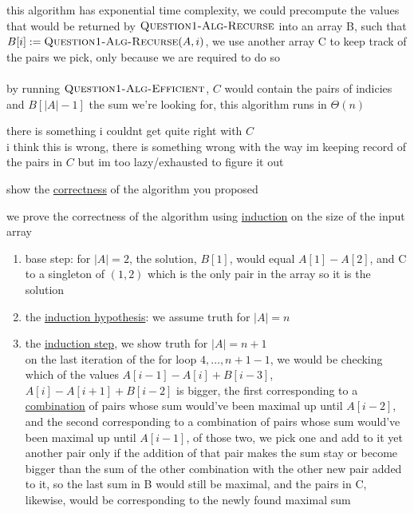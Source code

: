 \documentclass[a4paper,12pt]{article}
\begin{document}
\begin{question}
\begin{subquestion}
\begin{answer}
this algorithm has exponential time complexity, we could precompute the values that would be returned by \(\textsc{Question1-Alg-Recurse}\) into an array B, such that \(B[i] := \textsc{Question1-Alg-Recurse}(A, i)\), we use another array C to keep track of the pairs we pick, only because we are required to do so\\
\\

by running \(\textsc{Question1-Alg-Efficient}\), \(C\) would contain the pairs of indicies and \(B[|A|-1]\) the sum we're looking for, this algorithm runs in \(\Theta(n)\)\\
\begin{note}
there is something i couldnt get quite right with \(C\)\\
i think this is wrong, there is something wrong with the way im keeping record of the pairs in \(C\) but im too lazy/exhausted to figure it out\\
\end{note}
\end{answer}
\end{subquestion}
\begin{subquestion}
show the \href{20221104220603-algorithm_correctness.org}{correctness} of the algorithm you proposed\\
\begin{answer}
we prove the correctness of the algorithm using \href{20220707193301-mathematical_induction.org}{induction} on the size of the input array\\
\begin{enumerate}
\item base step: for \(|A|=2\), the solution, \(B[1]\), would equal \(A[1]-A[2]\), and C to a singleton of \((1,2)\) which is the only pair in the array so it is the solution\\
\item the \href{20230108230724-induction_hypothesis.org}{induction hypothesis}: we assume truth for \(|A|=n\)\\
\item the \href{20230108230748-induction_step.org}{induction step}, we show truth for \(|A|=n+1\)\\
on the last iteration of the for loop \(4,\dots,n+1-1\), we would be checking which of the values \(A[i-1]-A[i]+B[i-3]\),\(A[i]-A[i+1]+B[i-2]\) is bigger, the first corresponding to a \href{20221204105120-combinatorics.org}{combination} of pairs whose sum would've been maximal up until \(A[i-2]\), and the second corresponding to a combination of pairs whose sum would've been maximal up until \(A[i-1]\), of those two, we pick one and add to it yet another pair only if the addition of that pair makes the sum stay or become bigger than the sum of the other combination with the other new pair added to it, so the last sum in B would still be maximal, and the pairs in C, likewise, would be corresponding to the newly found maximal sum\\

\end{enumerate}
\end{answer}
\end{subquestion}
\end{question}
\end{document}
